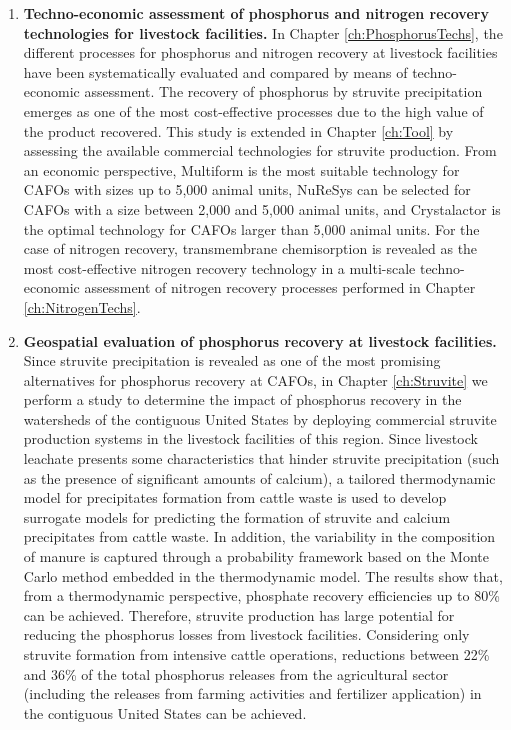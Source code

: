 \begin{enumerate}[font=\bfseries]
	\item \textbf{Techno-economic assessment of phosphorus and nitrogen recovery technologies for livestock facilities.} In Chapter \ref{ch:PhosphorusTechs}, the different processes for phosphorus and nitrogen recovery at livestock facilities have been systematically evaluated and compared by means of techno-economic assessment. The recovery of phosphorus by struvite precipitation
	emerges as one of the most cost-effective processes due to the high value of the product recovered. This study is extended in Chapter \ref{ch:Tool} by assessing the available commercial technologies for struvite production. From an economic perspective, Multiform is the most suitable technology for CAFOs with sizes up to 5,000 animal units, NuReSys can be selected for CAFOs with a size between 2,000 and 5,000 animal units, and Crystalactor is the optimal technology for CAFOs larger than 5,000 animal units.
	For the case of nitrogen recovery, transmembrane chemisorption is revealed as the most cost-effective nitrogen recovery technology in a multi-scale techno-economic assessment of nitrogen recovery processes performed in Chapter \ref{ch:NitrogenTechs}. 
	
	\item \textbf{Geospatial evaluation of phosphorus recovery at livestock facilities.} Since struvite precipitation is revealed as one of the most promising alternatives for phosphorus recovery at CAFOs, in Chapter \ref{ch:Struvite} we perform a study to determine the impact of phosphorus recovery in the watersheds of the contiguous United States by deploying commercial struvite production systems in the livestock facilities of this region. Since livestock leachate 	presents some characteristics that hinder struvite precipitation (such as the presence of significant amounts of calcium), a tailored thermodynamic model for precipitates formation from cattle waste is used to develop surrogate models for predicting the formation of struvite and calcium precipitates from cattle waste. In addition, the variability in the composition of manure is captured through a probability framework based on the Monte Carlo method embedded in the thermodynamic model. The results show that, from a thermodynamic perspective, phosphate recovery efficiencies up to 80\% can be achieved. Therefore, struvite production has large potential for reducing the phosphorus losses from livestock facilities. Considering only struvite formation from intensive cattle operations, reductions between 22\% and 36\% of the total phosphorus releases from the 	agricultural sector (including the releases from farming activities and fertilizer application) in the contiguous United States can be achieved.
	

\end{enumerate}
